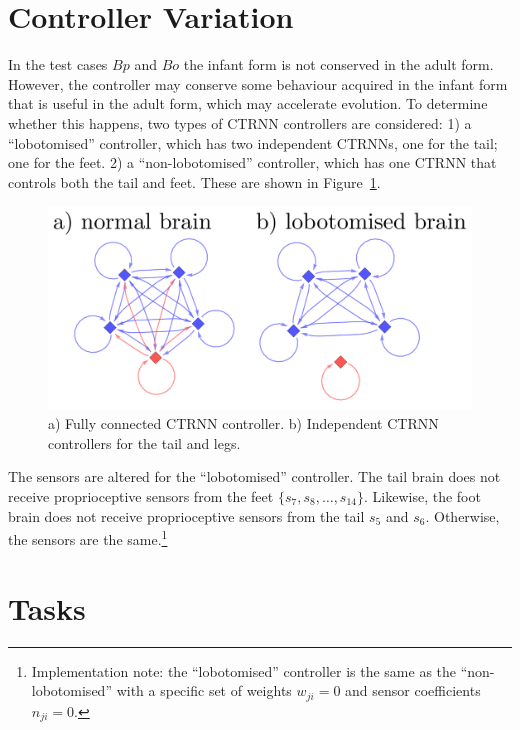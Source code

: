 \section{Controller Variation}

In the test cases $Bp$ and $Bo$ the infant form is not conserved in
the adult form.  However, the controller may conserve some behaviour
acquired in the infant form that is useful in the adult form, which
may accelerate evolution.  To determine whether this happens, two
types of CTRNN controllers are considered: 1) a ``lobotomised''
controller, which has two independent CTRNNs, one for the tail; one
for the feet. 2) a ``non-lobotomised'' controller, which has one CTRNN
that controls both the tail and feet.  These are shown in
Figure~\ref{ctrnn-figures}.

\begin{figure}[h]
  \centering
  \includegraphics[width=5in]{fig/ctrnn-figures.pdf}
  \vspace{-15pt}
  \caption[Variation of CTRNN controllers]{\label{ctrnn-figures}a)
    Fully connected CTRNN controller. b) Independent CTRNN controllers
    for the tail and legs.}
\end{figure}

The sensors are altered for the ``lobotomised'' controller.  The tail
brain does not receive proprioceptive sensors from the feet $\{s_7,
s_8, \ldots, s_14\}$.  Likewise, the foot brain does not receive
proprioceptive sensors from the tail $s_5$ and $s_6$.  Otherwise, the
sensors are the same.\footnote{Implementation note: the
  ``lobotomised'' controller is the same as the ``non-lobotomised''
  with a specific set of weights $w_{ji} = 0$ and sensor coefficients
  $n_{ji} = 0$.}

\section{Tasks}

